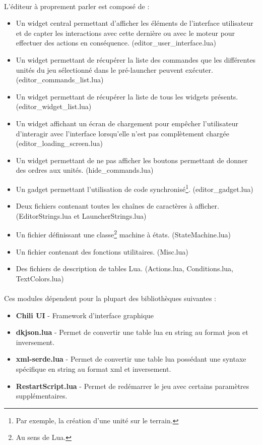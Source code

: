 \documentclass[a4paper]{article}
\begin{document}
\paragraph{}
L'éditeur à proprement parler est composé de :
\begin{itemize}
\item Un widget central permettant d'afficher les éléments de l'interface utilisateur et de capter les interactions avec cette dernière ou avec le moteur pour effectuer des actions en conséquence. (editor\_user\_interface.lua)
\item Un widget permettant de récupérer la liste des commandes que les différentes unités du jeu sélectionné dans le pré-launcher peuvent exécuter. (editor\_commands\_list.lua)
\item Un widget permettant de récupérer la liste de tous les widgets présents. (editor\_widget\_list.lua)
\item Un widget affichant un écran de chargement pour empêcher l'utilisateur d'interagir avec l'interface lorsqu'elle n'est pas complètement chargée (editor\_loading\_screen.lua)
\item Un widget permettant de ne pas afficher les boutons permettant de donner des ordres aux unités. (hide\_commands.lua)
\item Un gadget permettant l'utilisation de code synchronisé\footnote{Par exemple, la création d'une unité sur le terrain.}. (editor\_gadget.lua)
\item Deux fichiers contenant toutes les chaînes de caractères à afficher. (EditorStrings.lua et LauncherStrings.lua)
\item Un fichier définissant une classe\footnote{Au sens de Lua.} machine à états. (StateMachine.lua)
\item Un fichier contenant des fonctions utilitaires. (Misc.lua)
\item Des fichiers de description de tables Lua. (Actions.lua, Conditions.lua, TextColors.lua)
\end{itemize}
\paragraph{}
Ces modules dépendent pour la plupart des bibliothèques suivantes :
\begin{itemize}
\item \textbf{Chili UI} - Framework d'interface graphique
\item \textbf{dkjson.lua} - Permet de convertir une table lua en string au format json et inversement.
\item \textbf{xml-serde.lua} - Permet de convertir une table lua possédant une syntaxe spécifique en string au format xml et inversement.
\item \textbf{RestartScript.lua} - Permet de redémarrer le jeu avec certains paramètres supplémentaires.
\end{itemize}
\end{document}
